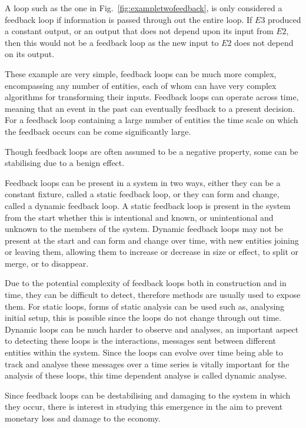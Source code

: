 \documentclass{article}
\begin{document}
A loop such as the one in Fig.~\ref{fig:exampletwofeedback}, is only considered a feedback loop if information is passed through out the entire loop. If $E3$ produced a constant output, or an output that does not depend upon its input from $E2$, then this would not be a feedback loop as the new input to $E2$ does not depend on its output.

These example are very simple, feedback loops can be much more complex, encompassing any number of entities, each of whom can have very complex algorithms for transforming their inputs. Feedback loops can operate across time, meaning that an event in the past can eventually feedback to a present decision. For a feedback loop containing a large number of entities the time scale on which the feedback occurs can be come significantly large.

Though feedback loops are often assumed to be a negative property, some can be stabilising due to a benign effect.

Feedback loops can be present in a system in two ways, either they can be a constant fixture, called a static feedback loop, or they can form and change, called a dynamic feedback loop. A static feedback loop is present in the system from the start whether this is intentional and known, or unintentional and unknown to the members of the system. Dynamic feedback loops may not be present at the start and can form and change over time, with new entities joining or leaving them, allowing them to increase or decrease in size or effect, to split or merge, or to disappear.

Due to the potential complexity of feedback loops both in construction and in time, they can be difficult to detect, therefore methods are usually used to expose them. For static loops, forms of static analysis can be used such as, analysing initial setup, this is possible since the loops do not change through out time. Dynamic loops can be much harder to observe and analyses, an important aspect to detecting these loops is the interactions, messages sent between different entities within the system. Since the loops can evolve over time being able to track and analyse these messages over a time series is vitally important for the analysis of these loops, this time dependent analyse is called dynamic analyse.

Since feedback loops can be destabilising and damaging to the system in which they occur, there is interest in studying this emergence in the aim to prevent monetary loss and damage to the economy.
\end{document}
